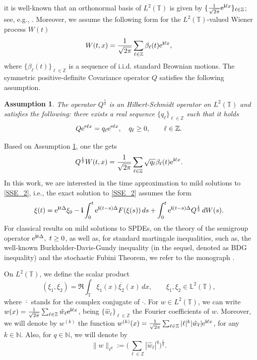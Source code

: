 \documentclass[a4paper]{amsart}
\newtheorem{assumption}[theorem]{Assumption}
\begin{document}
it is well-known that an orthonormal basis of $L^2(\mathbb{T})$ is given by $\{\frac{1}{\sqrt{2\pi}}{\rm e}^{{\bf i}\ell x}\}_{\ell\in\mathbb{Z}}$; see, e.g., \cite{lord}. Moreover, we assume the following form for the $L^2(\mathbb{T})$-valued Wiener process $W(t)$
$$
W(t,x)=\frac{1}{\sqrt{2\pi}}\sum_{\ell\in\mathbb{Z}}\beta_\ell(t){\rm e}^{{\bf i}\ell x},
$$
where $\{\beta_\ell(t)\}_{\ell\in\mathbb{Z}}$ is a sequence of i.i.d. standard Brownian motions. The symmetric positive-definite Covariance operator $Q$ satisfies the following assumption.
\begin{assumption}
\label{ass_q}
    The operator $Q^{\frac{1}{2}}$ is an Hilbert-Schmidt operator on $L^2(\mathbb{T})$ and satisfies the following: there exists a real sequence $\{q_\ell\}_{\ell\in\mathbb{Z}}$ such that it holds
    $$
    Q {\rm e}^{{\rm e}\ell x}=q_\ell{\rm e}^{{\rm e}\ell x}, \quad q_{\ell}\ge 0, \qquad \ell\in\mathbb{Z}.
    $$
\end{assumption}
Based on Assumption \ref{ass_q}, one the gets
$$
Q^{\frac{1}{2}}W(t,x)=\frac{1}{\sqrt{2\pi}} \sum_{\ell\in\mathbb{Z}} \sqrt{q_\ell} \beta_{\ell}(t){\rm e}^{{\bf i}\ell x}.
$$
In this work, we are interested in the time approximation to mild solutions to \eqref{SSE_2}, i.e., the exact solution to \eqref{SSE_2} assumes the form
$$
\xi(t)={\rm e}^{{\bf i}t \Delta}\xi_0-{\bf i}\int_0^t {\rm e}^{{\bf i}(t-s)\Delta}F(\xi(s))\,ds+\int_0^t {\rm e}^{{\bf i}(t-s)\Delta}Q^{\frac{1}{2}}\,dW(s).
$$
For classical results on mild solutions to SPDEs, on the theory of the semigroup operator ${\rm e}^{{\bf i}t\Delta}, \ t\ge 0$, as well as, for standard martingale inequalities, such as, the well-known Burkholder-Davis-Gundy inequality (in the sequel, denoted as BDG inequality) and the stochastic Fubini Theorem, we refer to the monograph \cite{dap}.

On $L^2(\mathbb{T})$, we define the scalar product
$$
(\xi_1,\xi_2)=\Re\int_{\mathbb{T}} \xi_1(x)\overline{\xi_2}(x)\,dx, \qquad \xi_1,\xi_2\in\mathbb{L}^2(\mathbb{T}),
$$
where $\overline{\cdot}$ stands for the complex conjugate of $\cdot$. For $w\in L^2(\mathbb{T})$, we can write $w(x)=\frac{1}{\sqrt{2\pi}}\sum_{\ell\in\mathbb{Z}} \hat{w}_{\ell} {\rm e}^{{\bf i}\ell x}$, being $\{\hat{w}_{\ell}\}_{\ell\in\mathbb{Z}}$ the Fourier coefficients of $w$. Moreover, we will denote by $w^{(k)}$ the function $w^{(k)}(x)=\frac{1}{\sqrt{2\pi}}\sum_{\ell\in\mathbb{Z}} |\ell|^k|\hat{w}_{\ell} |{\rm e}^{{\bf i}\ell x}$, for any $k\in\mathbb{N}$. Also, for $q\in\mathbb{N}$, we will denote by
$$
\|w\|_{\ell^q}:=\big(\sum_{\ell\in\mathbb{Z}} |\hat{w}_{\ell}|^q\big)^{\frac{1}{q}}.
$$
\end{document}
